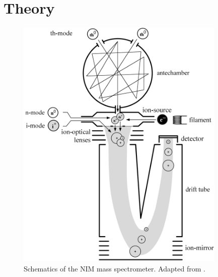 \section{Theory}

	\begin{figure}[h]
		\centering
		\includegraphics[width= 10cm]{Bilder/NIM_Sketch.png}
		\caption{Schematics of the NIM mass spectrometer. Adapted from \cite{Diss_Meyer}.}
		\label{fig:NIMSketch}
	\end{figure}
	
